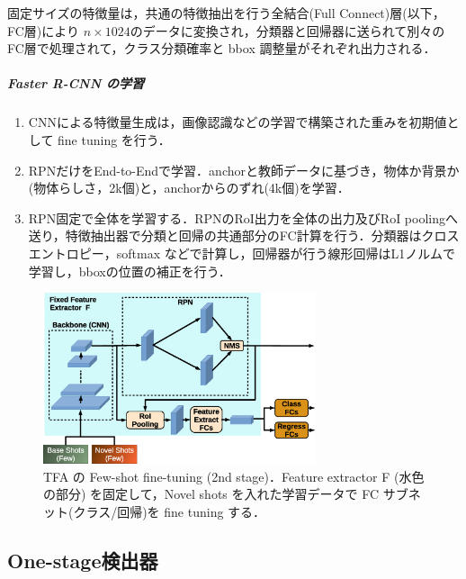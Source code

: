 \documentclass[twocolumn]{jsarticle} %
\begin{document}
固定サイズの特徴量は，共通の特徴抽出を行う全結合(Full Connect)層(以下，FC層)により $n{\times}1024$のデータに変換され，分類器と回帰器に送られて別々のFC層で処理されて，クラス分類確率と bbox 調整量がそれぞれ出力される．

\subparagraph{Faster R-CNN の学習} 
\begin{enumerate}
    \item CNNによる特徴量生成は，画像認識などの学習で構築された重みを初期値として fine tuning を行う．
    \item RPNだけをEnd-to-Endで学習．anchorと教師データに基づき，物体か背景か(物体らしさ，2k個)と，anchorからのずれ(4k個)を学習．
    \item RPN固定で全体を学習する．RPNのRoI出力を全体の出力及びRoI poolingへ送り，特徴抽出器で分類と回帰の共通部分のFC計算を行う．分類器はクロスエントロピー，softmax などで計算し，回帰器が行う線形回帰はL1ノルムで学習し，bboxの位置の補正を行う．
\end{enumerate}

\begin{figure}[tb]
    \begin{center}
        \includegraphics[width=8cm,clip]{fig/archi_TFA.eps}
    \end{center}
    \caption{ TFA の Few-shot fine-tuning (2nd stage)．Feature extractor F (水色の部分) を固定して，Novel shots を入れた学習データで FC サブネット(クラス/回帰)を fine tuning する．}
    \label{fig:archi_TFA}
\end{figure}

\subsection{One-stage検出器}
\end{document}
